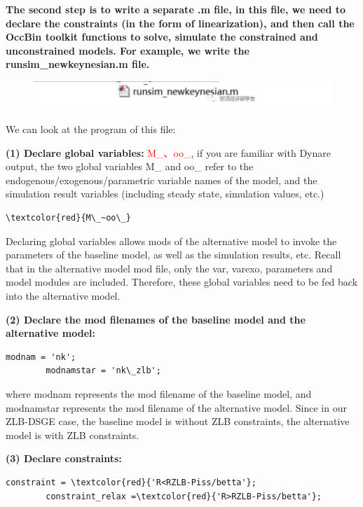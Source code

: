 \documentclass[10pt,math=newtx,citestyle=gb7714-2015,bibstyle=gb7714-2015]{elegantbook}
\begin{document}
{\begin{itemize}
	\textbf{The second step is to write a separate .m file, in this file, we need to declare the constraints (in the form of linearization), and then call the OccBin toolkit functions to solve, simulate the constrained and unconstrained models. For example, we write the runsim\_newkeynesian.m file.}
	
	\begin{figure}[htbp!]
		\centering
		\includegraphics[width=0.8\linewidth]{FIG/mfile}
		\centering
	\end{figure}
	
	We can look at the program of this file:
	
	\textbf{(1) Declare global variables: }\textcolor{red}{M\_、oo\_}, if you are familiar with Dynare output, the two global variables M\_ and oo\_ refer to the endogenous/exogenous/parametric variable names of the model, and the simulation result variables (including steady state, simulation values, etc.)
	
	\begin{lstlisting}[frame=shadowbox]
		\textcolor{red}{M\_~oo\_}
	\end{lstlisting}
	
	Declaring global variables allows mods of the alternative model to invoke the parameters of the baseline model, as well as the simulation results, etc. Recall that in the alternative model mod file, only the var, varexo, parameters and model modules are included. Therefore, these global variables need to be fed back into the alternative model.
	
	\textbf{(2) Declare the mod filenames of the baseline model and the alternative model:}
	
	\begin{lstlisting}[frame=shadowbox]
		modnam = 'nk';
		modnamstar = 'nk\_zlb';
	\end{lstlisting}
	
where modnam represents the mod filename of the baseline model, and modnamstar represents the mod filename of the alternative model. Since in our ZLB-DSGE case, the baseline model is without ZLB constraints, the alternative model is with ZLB constraints.
	
	\textbf{(3) Declare constraints:}
	
	\begin{lstlisting}[frame=shadowbox]
		constraint = \textcolor{red}{'R<RZLB-Piss/betta'};
		constraint_relax =\textcolor{red}{'R>RZLB-Piss/betta'};
	\end{lstlisting}
	

\end{itemize}}
\end{document}
